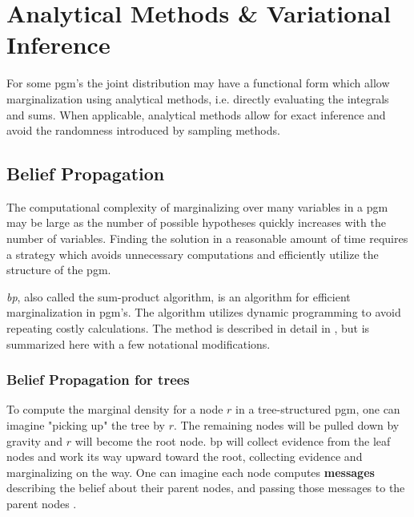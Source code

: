 \chapter{Analytical Methods \& Variational Inference}
For some \acrshort{pgm}'s the joint distribution may have a functional form which allow marginalization using analytical methods, i.e. directly evaluating the integrals and sums. When applicable, analytical methods allow for exact inference and avoid the randomness introduced by sampling methods. %


\section{Belief Propagation}
The computational complexity of marginalizing over many variables in a \acrshort{pgm} may be large as the number of possible hypotheses quickly increases with the number of variables. Finding the solution in a reasonable amount of time requires a strategy which avoids unnecessary computations and efficiently utilize the structure of the \acrshort{pgm}. 

\textit{\acrfull{bp}}, also called the sum-product algorithm, is an algorithm for efficient marginalization in \acrshort{pgm}'s. The algorithm utilizes dynamic programming to avoid repeating costly calculations. The method is described in detail in \cite[p .~710]{murphy}, but is summarized here with a few notational modifications. 


\subsection{Belief Propagation for trees}
To compute the marginal density for a node $r$ in a tree-structured \acrshort{pgm}, one can imagine "picking up" the tree by $r$. The remaining nodes will be pulled down by gravity and $r$ will become the root node. \acrshort{bp} will collect evidence from the leaf nodes and work its way upward toward the root, collecting evidence and marginalizing on the way. One can imagine each node computes \textbf{messages} describing the belief about their parent nodes, and passing those messages to the parent nodes \cite{murphy}.
